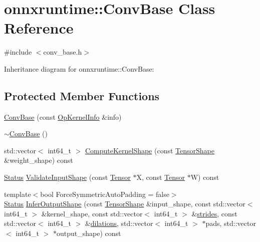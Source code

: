 \hypertarget{classonnxruntime_1_1ConvBase}{}\section{onnxruntime\+:\+:Conv\+Base Class Reference}
\label{classonnxruntime_1_1ConvBase}


{\ttfamily \#include $<$conv\+\_\+base.\+h$>$}



Inheritance diagram for onnxruntime\+:\+:Conv\+Base\+:
\subsection*{Protected Member Functions}
\begin{DoxyCompactItemize}
\item 
\mbox{\hyperlink{classonnxruntime_1_1ConvBase_a45226b6c1b85908b6d345f978bd5b646}{Conv\+Base}} (const \mbox{\hyperlink{classonnxruntime_1_1OpKernelInfo}{Op\+Kernel\+Info}} \&info)
\item 
\mbox{\hyperlink{classonnxruntime_1_1ConvBase_a1cce4373ad0c3eff0e0ec6219db1a15c}{$\sim$\+Conv\+Base}} ()
\item 
std\+::vector$<$ int64\+\_\+t $>$ \mbox{\hyperlink{classonnxruntime_1_1ConvBase_a75473e0ea902948d818bc4a4b8578592}{Compute\+Kernel\+Shape}} (const \mbox{\hyperlink{classonnxruntime_1_1TensorShape}{Tensor\+Shape}} \&weight\+\_\+shape) const
\item 
\mbox{\hyperlink{classonnxruntime_1_1common_1_1Status}{Status}} \mbox{\hyperlink{classonnxruntime_1_1ConvBase_ab65984bcf5c5ce841711fa2cfc440889}{Validate\+Input\+Shape}} (const \mbox{\hyperlink{classonnxruntime_1_1Tensor}{Tensor}} $\ast$X, const \mbox{\hyperlink{classonnxruntime_1_1Tensor}{Tensor}} $\ast$W) const
\item 
{\footnotesize template$<$bool Force\+Symmetric\+Auto\+Padding = false$>$ }\\\mbox{\hyperlink{classonnxruntime_1_1common_1_1Status}{Status}} \mbox{\hyperlink{classonnxruntime_1_1ConvBase_a344978b6239c1b49ab049ca95eaf6f8b}{Infer\+Output\+Shape}} (const \mbox{\hyperlink{classonnxruntime_1_1TensorShape}{Tensor\+Shape}} \&input\+\_\+shape, const std\+::vector$<$ int64\+\_\+t $>$ \&kernel\+\_\+shape, const std\+::vector$<$ int64\+\_\+t $>$ \&\mbox{\hyperlink{mkldnn_2nn_2pool_8cc_abdced837e2fca213b15df1588e8782c4}{strides}}, const std\+::vector$<$ int64\+\_\+t $>$ \&\mbox{\hyperlink{mkldnn_2nn_2conv_8cc_a57cdc76062a8d113d8204fa0b160836b}{dilations}}, std\+::vector$<$ int64\+\_\+t $>$ $\ast$pads, std\+::vector$<$ int64\+\_\+t $>$ $\ast$output\+\_\+shape) const
\end{DoxyCompactItemize}
